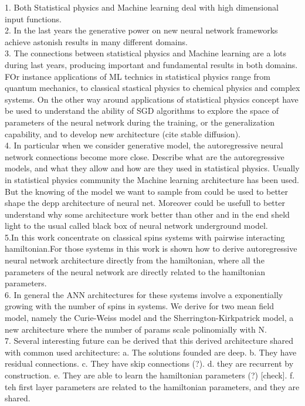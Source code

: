 \documentclass[aps,physrev,10pt,floatfix,longbibliography,nofootinbib,reprint]{revtex4-2}
\begin{document}
1. Both Statistical physics and Machine learning deal with high dimensional input functions.\\
2. In the last years the generative power on new neural network frameworks achieve astonish results in many different domains.\\
3. The connections between statistical physics and Machine learning are a lots during last years, producing important and fundamental results in both domains. FOr instance applications of ML technics in statistical physics range from quantum mechanics, to classical stastical physics to chemical physics and complex systems. On the other way around applications of statistical physics concept have be used to understand the ability of SGD algorithms to explore the space of parameters of the neural network during the training, or the generalization capability, and to develop new architecture (cite stable diffusion).\\
4. In particular when we consider generative model, the autoregressive neural network connections become more close. Describe what are the autoregressive models, and what they allow and how are they used in statistical physics. Usually in statistical physics community the Machine learning architecture has been used. But the knowing of the model we want to sample from could be used to better shape the depp architecture of neural net. Moreover could be usefull to better understand why some architecture work better than other and in the end sheld light to the usual called black box of neural network underground model.\\
5.In this work concentrate on classical spins systems with pairwise interacting hamiltonian.For those systems in this work is shown how to derive autoregressive neural network architecture directly from the hamiltonian, where all the parameters of the neural network are directly related to the hamiltonian parameters.\\
6. In general the ANN architectures for these systems involve a exponentially growing with the number of spins in  systems. We derive for two mean field model, namely the Curie-Weiss model and the Sherrington-Kirkpatrick model, a new architecture where the number of params scale polinomially with N.\\
7. Several interesting future can be derived that this derived architecture shared with common used architecture:
      a. The solutions founded are deep.
      b. They have residual connections.
      c. They have skip connections (?).
      d. they are recurrent by construction.
      e. They are able to learn the hamiltonian parameters (?) [check].
      f. teh first layer parameters are related to the hamiltonian parameters, and they are shared.
\end{document}
